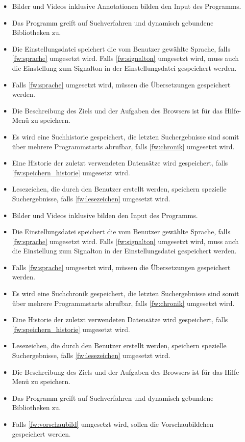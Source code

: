 \begin{itemize}
	\item Bilder und Videos inklusive Annotationen bilden den Input des Programms.
	\item Das Programm greift auf Suchverfahren und dynamisch gebundene Bibliotheken zu.
	\item Die Einstellungsdatei speichert die vom Benutzer gewählte Sprache, falls \ref{fw:sprache} umgesetzt wird. Falls \ref{fw:signalton} umgesetzt wird, muss auch die Einstellung zum Signalton in der Einstellungsdatei gespeichert werden.
	\item Falls \ref{fw:sprache} umgesetzt wird, müssen die Übersetzungen gespeichert werden.
	\item Die Beschreibung des Ziels und der Aufgaben des Browsers ist für das Hilfe-Menü zu speichern.
	\item Es wird eine Suchhistorie gespeichert, die letzten Suchergebnisse sind somit über mehrere Programmstarts abrufbar, falls \ref{fw:chronik} umgesetzt wird. 
	\item Eine Historie der zuletzt verwendeten Datensätze wird gespeichert, falls \ref{fw:speichern_historie} umgesetzt wird.
	\item Lesezeichen, die durch den Benutzer erstellt werden, speichern spezielle Suchergebnisse, falls \ref{fw:lesezeichen} umgesetzt wird.
	\item Bilder und Videos inklusive  bilden den Input des Programms.
	\item Die Einstellungsdatei speichert die vom Benutzer gewählte Sprache, falls \ref{fw:sprache} umgesetzt wird. Falls \ref{fw:signalton} umgesetzt wird, muss auch die Einstellung zum Signalton in der Einstellungsdatei gespeichert werden.
	\item Falls \ref{fw:sprache} umgesetzt wird, müssen die Übersetzungen gespeichert werden.
	\item Es wird eine \gls{Suchchronik} gespeichert, die letzten Suchergebnisse sind somit über mehrere Programmstarts abrufbar, falls \ref{fw:chronik} umgesetzt wird. 
	\item Eine Historie der zuletzt verwendeten Datensätze wird gespeichert, falls \ref{fw:speichern_historie} umgesetzt wird.
	\item \gls{Lesezeichen}, die durch den Benutzer erstellt werden, speichern spezielle Suchergebnisse, falls \ref{fw:lesezeichen} umgesetzt wird.
	\item Die Beschreibung des Ziels und der Aufgaben des Browsers ist für das Hilfe-Menü zu speichern.
	\item Das Programm greift auf \gls{Suchverfahren} und dynamisch gebundene Bibliotheken zu.
	\item Falls \ref{fw:vorschaubild} umgesetzt wird, sollen die Vorschaubildchen gespeichert werden.
\end{itemize}
\pagebreak
